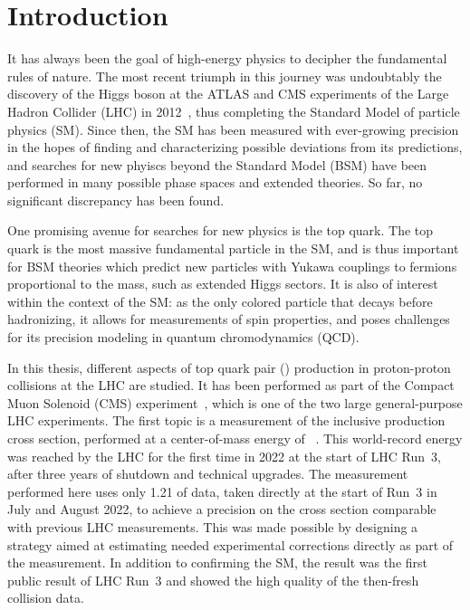 \chapter{Introduction}
\label{ch:intro}


It has always been the goal of high-energy physics to decipher the fundamental rules of nature. The most recent triumph in this journey was undoubtably the discovery of the Higgs boson at the ATLAS and CMS experiments of the Large Hadron Collider (LHC) in 2012~\cite{ATLAS:2012tfa,CMS:HIG-12-028,CMS:HIG-12-036}, thus completing the Standard Model of particle physics (SM). Since then, the SM has been measured with ever-growing precision in the hopes of finding and characterizing possible deviations from its predictions, and searches for new phyiscs beyond the Standard Model (BSM) have been performed in many possible phase spaces and extended theories. So far, no significant discrepancy has been found.

One promising avenue for searches for new physics is the top quark. The top quark is the most massive fundamental particle in the SM, and is thus important for BSM theories which predict new particles with Yukawa couplings to fermions proportional to the mass, such as extended Higgs sectors. It is also of interest within the context of the SM: as the only colored particle that decays before hadronizing, it allows for measurements of spin properties, and poses challenges for its precision modeling in quantum chromodynamics (QCD). 

\medskip

In this thesis, different aspects of top quark pair (\ttbar) production in proton-proton collisions at the LHC are studied. It has been performed as part of the Compact Muon Solenoid (CMS) experiment~\cite{CMS:2008xjf}, which is one of the two large general-purpose LHC experiments. The first topic is a measurement of the inclusive \ttbar production cross section, performed at a center-of-mass energy of \sqrtsRIII~\cite{CMS:TOP-22-012}. This world-record energy was reached by the LHC for the first time in 2022 at the start of LHC Run~3, after three years of shutdown and technical upgrades. The measurement performed here uses only \SI{1.21}{\fbinv} of data, taken directly at the start of Run~3 in July and August 2022, to achieve a precision on the \ttbar cross section comparable with previous LHC measurements. This was made possible by designing a strategy aimed at estimating needed experimental corrections directly as part of the measurement. In addition to confirming the SM, the result was the first public result of LHC Run~3 and showed the high quality of the then-fresh collision data.

